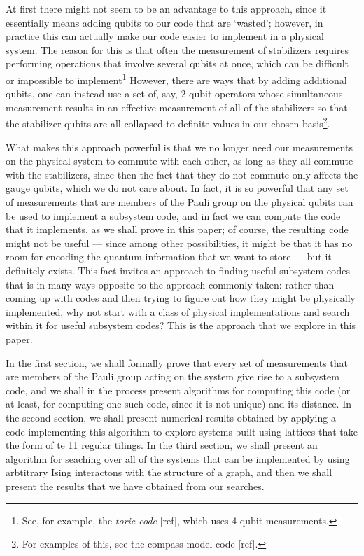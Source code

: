 \documentclass[twocolumn,showpacs,preprintnumbers,amsmath,amssymb,nofootinbib,pra,floatfix]{revtex4}
\begin{document}
At first there might not seem to be an advantage to this approach,
since it essentially means adding qubits to our code that are
`wasted'; however, in practice this can actually make our code easier
to implement in a physical system.  The reason for this is that often
the measurement of stabilizers requires performing operations that
involve several qubits at once, which can be difficult or impossible
to implement\footnote{See, for example, the \emph{toric code} [ref],
which uses 4-qubit measurements.}  However, there are ways that by
adding additional qubits, one can instead use a set of, say, 2-qubit
operators whose simultaneous measurement results in an effective
measurement of all of the stabilizers so that the stabilizer qubits
are all collapsed to definite values in our chosen basis\footnote{For
examples of this, see the compass model code [ref].}.

What makes this approach powerful is that we no longer need our
measurements on the physical system to commute with each other, as
long as they all commute with the stabilizers, since then the fact
that they do not commute only affects the gauge qubits, which we do
not care about.  In fact, it is so powerful that any set of
measurements that are members of the Pauli group on the physical
qubits can be used to implement a subsystem code, and in fact we can
compute the code that it implements, as we shall prove in this paper;
of course, the resulting code might not be useful --- since among
other possibilities, it might be that it has no room for encoding the
quantum information that we want to store --- but it definitely
exists.  This fact invites an approach to finding useful subsystem
codes that is in many ways opposite to the approach commonly taken:
rather than coming up with codes and then trying to figure out how
they might be physically implemented, why not start with a class of
physical implementations and search within it for useful subsystem
codes?  This is the approach that we explore in this paper.

In the first section, we shall formally prove that every set of
measurements that are members of the Pauli group acting on the system
give rise to a subsystem code, and we shall in the process present
algorithms for computing this code (or at least, for computing one
such code, since it is not unique) and its distance.  In the second
section, we shall present numerical results obtained by applying a
code implementing this algorithm to explore systems built using
lattices that take the form of te 11 regular tilings.  In the third
section, we shall present an algorithm for seaching over all of the
systems that can be implemented by using arbtitrary Ising interactons
with the structure of a graph, and then we shall present the results
that we have obtained from our searches.
\end{document}
